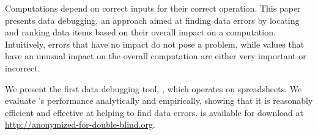 Computations depend on correct inputs for their correct
operation. This paper presents data debugging, an approach aimed at
finding data errors by locating and ranking data items based on their
overall impact on a computation. Intuitively, errors that have no
impact do not pose a problem, while values that have an unusual impact
on the overall computation are either very important or incorrect.

We present the first data debugging
tool, \checkcell{}, which operates on spreadsheets. We evaluate
\checkcell{}'s performance analytically and empirically, showing that
it is reasonably efficient and effective at helping to find data
errors. \checkcell{} is available for download at
\url{http://anonymized-for-double-blind.org}.

